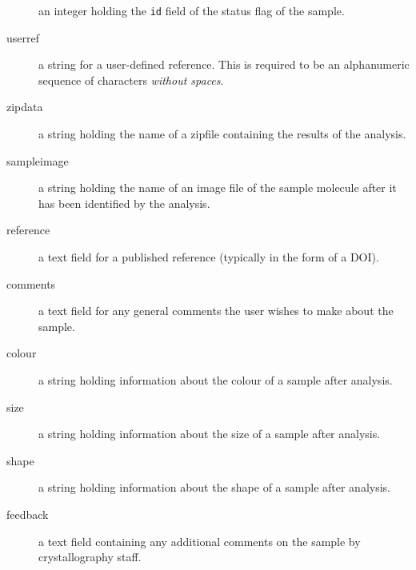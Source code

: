 \documentclass[12pt,twoside]{article}
\begin{document}
\begin{description}
an integer holding the \verb=id= field of the status flag of the sample.
\item[userref]
a string for a user-defined reference. This is required to be an
alphanumeric sequence of characters \emph{without spaces}.
\item[zipdata]
a string holding the name of a zipfile containing the results of the analysis.
\item[sampleimage]
a string holding the name of an image file of the sample molecule after it
has been identified by the analysis.
\item[reference]
a text field for a published reference (typically in the form of a DOI).
\item[comments]
a text field for any general comments the user wishes to make about the sample.
\item[colour]
a string holding information about the colour of a sample after analysis.
\item[size]
a string holding information about the size of a sample after analysis.
\item[shape]
a string holding information about the shape of a sample after analysis.
\item[feedback]
a text field containing any additional comments on the sample by
crystallography staff.
\end{description}
\end{document}
